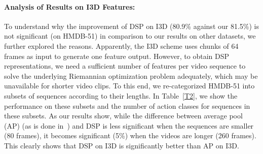 \documentclass[runningheads]{llncs}
\newcommand{\para}[1]{\noindent\paragraph*{\textbf{#1}}}
\begin{document}
\begin{figure}
\begin{floatrow}
\end{floatrow}
\end{figure}

\para{Analysis of Results on I3D Features:} To understand why the improvement of DSP on I3D (80.9\% against our 81.5\%) is not significant (on HMDB-51) in comparison to our results on other datasets, we further explored the reasons. Apparently, the I3D scheme uses chunks of 64 frames as input to generate one feature output. However, to obtain DSP representations, we need a sufficient number of features per video sequence to solve the underlying Riemannian optimization problem adequately, which may be unavailable for shorter video clips. To this end, we re-categorized HMDB-51 into subsets of sequences according to their lengths. In Table~\ref{T2}, we show the performance on these subsets and the number of action classes for sequences in these subsets. As our results show, while the difference between average pool (AP) (as is done in~\cite{carreira2017quo}) and DSP is less significant when the sequences are smaller (80 frames), it becomes significant (5\%) when the videos are longer (260 frames). This clearly shows that DSP on I3D is significantly better than AP on I3D. 
\end{document}
